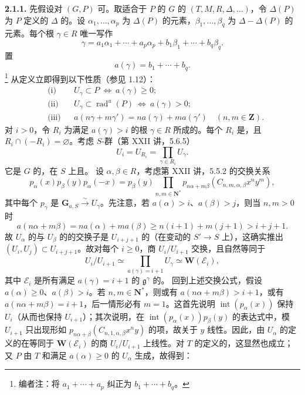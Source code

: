 \textbf{2.1.1.} 先假设对 $(G,P)$ 可。取适合于 $P$ 的 $G$ 的 $(T,M,R,\Delta,\ldots)$，令 $\Delta(P)$ 为 $P$ 定义的 $\Delta$ 的。设 $\alpha_1,\ldots,\alpha_p$ 为 $\Delta(P)$ 的元素，$\beta_1,\ldots,\beta_q$ 为 $\Delta-\Delta(P)$ 的元素。每个根 $\gamma\in R$ 唯一写作
\[\gamma=a_1\alpha_1+\cdots+a_p\alpha_p+b_1\beta_1+\cdots+b_q\beta_q.\]
置
\[a(\gamma)=b_1+\cdots+b_q.\]
\footnote{编者注：将 $a_1+\cdots+a_p$ 纠正为 $b_1+\cdots+b_q$。}
从定义立即得到以下性质（参见 1.12）：
\[\begin{aligned}
{}&\text{(i)}&&U_\gamma\subset P\ \Longleftrightarrow\ a(\gamma)\ge0;\\
&\text{(ii)}&&U_\gamma\subset\operatorname{rad}^{u}(P)\ \Longleftrightarrow\ a(\gamma)>0;\\
&\text{(iii)}&&a(n\gamma+m\gamma')=na(\gamma)+ma(\gamma')\quad(n,m\in\mathbf Z).
\end{aligned}\]
对 $i>0$，令 $R_i$ 为满足 $a(\gamma)>i$ 的根 $\gamma\in R$ 所成的。每个 $R_i$ 是，且 $R_i\cap(-R_i)=\varnothing$。考虑 $S$-群（第 XXII 讲，5.6.5）
\[U_i=U_{R_i}=\prod_{\gamma\in R_i}U_\gamma.\]
它是 $G$ 的，在 $S$ 上且。
设 $\alpha,\beta\in R$，考虑第 XXII 讲，5.5.2 的交换关系
\[p_\alpha(x)p_\beta(y)p_\alpha(-x)=p_\beta(y)\prod_{n,m\in\mathbf N^*}p_{n\alpha+m\beta}(C_{n,m,\alpha,\beta}x^ny^m),\]
其中每个 $p_\gamma$ 是 $\mathbf G_{a,S}\xrightarrow{\sim}U_\gamma$。先注意，若 $a(\alpha)>i$、$a(\beta)>j$，则当 $n,m>0$ 时
\[a(n\alpha+m\beta)=na(\alpha)+ma(\beta)\ge n(i+1)+m(j+1)>i+j+1.\]
故 $U_\alpha$ 的与 $U_\beta$ 的的交换子是 $U_{i+j+1}$ 的（在变动的 $S'\to S$ 上），这确实推出 $(U_i,U_j)\subset U_{i+j+1}$。故对每个 $i\ge0$，商 $U_i/U_{i+1}$ 交换，且自然等同于
\[U_i/U_{i+1}\simeq\prod_{a(\gamma)=i+1}U_\gamma\simeq\mathbf W(\mathcal E_i),\]
其中 $\mathcal E_i$ 是所有满足 $a(\gamma)=i+1$ 的 $\mathfrak g^\gamma$ 的。
回到上述交换公式，假设 $a(\alpha)\ge0$、$a(\beta)>i$。若 $n,m\in\mathbf N^*$，则或有 $a(n\alpha+m\beta)>i+1$，或有 $a(n\alpha+m\beta)=i+1$，后一情形必有 $m=1$。这首先说明 $\operatorname{int}(p_\alpha(x))$ 保持 $U_i$（从而也保持 $U_{i+1}$）；其次说明，在 $\operatorname{int}(p_\alpha(x))p_\beta(y)$ 的表达式中，模 $U_{i+1}$ 只出现形如 $p_{n\alpha+\beta}(C_{n,1,\alpha,\beta}x^ny)$ 的项，故关于 $y$ 线性。因此，由 $U_\alpha$ 的定义的在等同于 $\mathbf W(\mathcal E_i)$ 的商 $U_i/U_{i+1}$ 上线性。对 $T$ 的定义的，这显然也成立；又 $P$ 由 $T$ 和满足 $a(\alpha)\ge0$ 的 $U_\alpha$ 生成，故得到：
